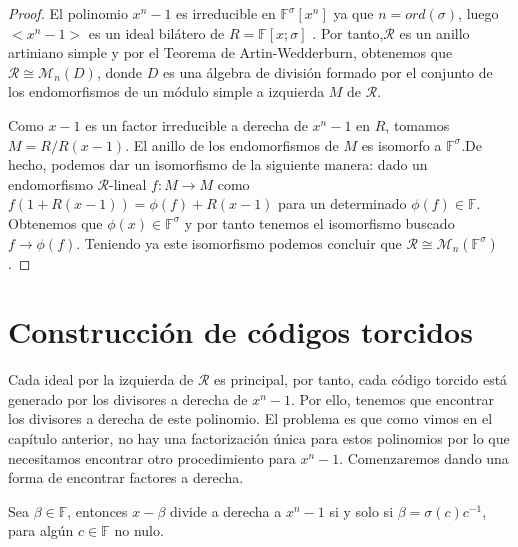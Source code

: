 \begin{proof}
El polinomio $x^n-1$ es irreducible en $\mathbb{F}^{\sigma}[x^n]$ ya que $n = ord(\sigma)$, luego $<x^n-1>$ es un ideal bilátero de $R = \mathbb{F}[x;\sigma]$ . Por tanto,$\mathcal{R}$ es un anillo artiniano simple y por el Teorema de Artin-Wedderburn, obtenemos que $\mathcal{R} \cong \mathcal{M}_n(D)$, donde $D$ es una álgebra de división formado por el conjunto de los endomorfismos de un módulo simple a izquierda $M$ de $\mathcal{R}$.

Como $x-1$ es un factor irreducible a derecha de $x^n-1$ en $R$, tomamos $M=R/R(x-1)$. El anillo de los endomorfismos de $M$ es isomorfo a $\mathbb{F}^{\sigma}$.De hecho, podemos dar un isomorfismo de la siguiente manera: dado un endomorfismo $\mathcal{R}$-lineal $f:M \rightarrow M$ como $f(1+R(x-1)) = \phi(f) + R(x-1)$ para un determinado $\phi(f) \in \mathbb{F}$. Obtenemos que $\phi(x) \in \mathbb{F}^{\sigma}$ y por tanto tenemos el isomorfismo buscado $f \rightarrow \phi(f)$. Teniendo ya este isomorfismo podemos concluir que $\mathcal{R} \cong \mathcal{M}_n(\mathbb{F}^{\sigma})$.
\end{proof}


\section{Construcción de códigos torcidos}

Cada ideal por la izquierda de $\mathcal{R}$ es principal, por tanto, cada código torcido está generado por los divisores a derecha de $x^n-1$. Por ello, tenemos que encontrar los divisores a derecha de este polinomio. El problema es que como vimos en el capítulo anterior, no hay una factorización única para estos polinomios por lo que necesitamos encontrar otro procedimiento para $x^n-1$. Comenzaremos dando una forma de encontrar factores a derecha.

\begin{proposition}
    Sea $\beta \in \mathbb{F}$, entonces $x - \beta$ divide a derecha a $x^n-1$ si y solo si $\beta = \sigma(c)c^{-1}$, para algún $c \in \mathbb{F}$ no nulo.
\end{proposition}

